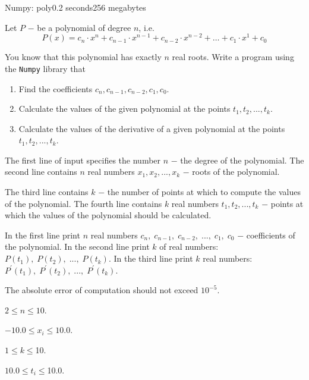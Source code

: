 \begin{problem}{Numpy: poly}{}{}{0.2 seconds}{256 megabytes}


Let $P$ $-$ be a polynomial of degree $n$, i.e.
$$
  P(x) = c_n \cdot x^n + c_{n-1} \cdot x^{n-1} + c_{n-2} \cdot x^{n-2} + \dots + c_{1} \cdot x^{1} + c_{0} 
$$


You know that this polynomial has exactly $n$ real roots.
Write a program using the \texttt{Numpy} library that
\begin{enumerate}
 \item Find the coefficients $c_n, c_{n-1}, c_{n-2}, c_{1}, c_{0}$.
 \item Calculate the values of the given polynomial at the points $t_1, t_2, ..., t_k$.
 \item Calculate the values of the derivative of a given polynomial at the points $t_1, t_2, ..., t_k$.
\end{enumerate}




\InputFile
The first line of input specifies the number $n$ $-$ the degree of the polynomial.
The second line contains $n$ real numbers $x_1, x_2, ..., x_k$ $-$ roots of the polynomial.

The third line contains $k$ $-$ the number of points at which to compute the values of the polynomial.
The fourth line contains $k$ real numbers $t_1, t_2, ..., t_k$ $-$ points at which the values of the polynomial should be calculated.


\OutputFile
In the first line print $n$ real numbers $c_n,\; c_{n-1}, \; c_{n-2}, \; ..., \; c_{1}, \; c_{0}$ $-$ coefficients of the polynomial.
In the second line print $k$ of real numbers: $P(t_1), \; P(t_2),\; ...,\; P(t_k)$.
In the third line print $k$ real numbers: $P^\prime(t_1),\; P^\prime(t_2), \; ..., \; P^\prime(t_k)$.


The absolute error of computation should not exceed $10^{-5}$.


\Constraints
$2 \le n \le 10$.

$-10.0 \le x_i \le 10.0$.

$1 \le k \le $10.

$10.0 \le t_i \le $10.0.

\Examples
\begin{example}
%
%
\end{example}


\end{problem}

